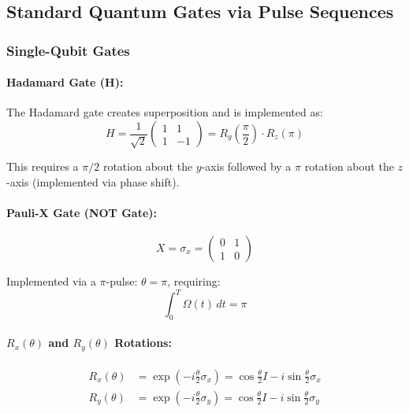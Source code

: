 \documentclass[12pt,a4paper]{article}
\theoremstyle{definition}
\begin{document}
\subsection{Standard Quantum Gates via Pulse Sequences}

\subsubsection{Single-Qubit Gates}

\paragraph{Hadamard Gate (H):}
The Hadamard gate creates superposition and is implemented as:
\begin{equation}
H = \frac{1}{\sqrt{2}}\begin{pmatrix} 1 & 1 \\ 1 & -1 \end{pmatrix} = R_y\left(\frac{\pi}{2}\right) \cdot R_z(\pi)
\label{eq:hadamard}
\end{equation}

This requires a $\pi/2$ rotation about the $y$-axis followed by a $\pi$ rotation about the $z$-axis (implemented via phase shift).

\paragraph{Pauli-X Gate (NOT Gate):}
\begin{equation}
X = \sigma_x = \begin{pmatrix} 0 & 1 \\ 1 & 0 \end{pmatrix}
\label{eq:pauli_x}
\end{equation}

Implemented via a $\pi$-pulse: $\theta = \pi$, requiring:
\begin{equation}
\int_0^T \Omega(t) \, dt = \pi
\label{eq:pi_pulse}
\end{equation}

\paragraph{$R_x(\theta)$ and $R_y(\theta)$ Rotations:}
\begin{align}
R_x(\theta) &= \exp\left(-i\frac{\theta}{2}\sigma_x\right) = \cos\frac{\theta}{2}I - i\sin\frac{\theta}{2}\sigma_x \label{eq:rx}\\
R_y(\theta) &= \exp\left(-i\frac{\theta}{2}\sigma_y\right) = \cos\frac{\theta}{2}I - i\sin\frac{\theta}{2}\sigma_y \label{eq:ry}
\end{align}
\end{document}
